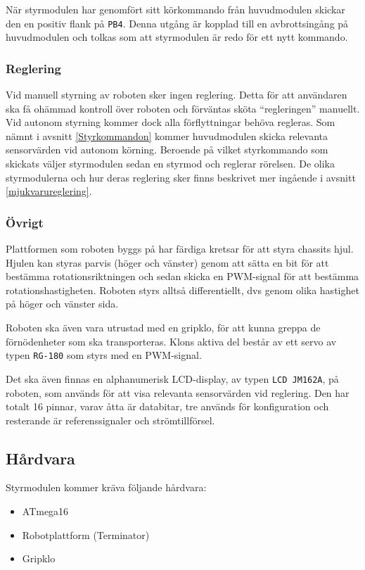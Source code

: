 \documentclass[11pt]{article}
\begin{document}
\begin{flushleft}
När styrmodulen har genomfört sitt körkommando från huvudmodulen skickar den en positiv flank på \verb+PB4+. Denna utgång är kopplad till en avbrottsingång på huvudmodulen och tolkas som att styrmodulen är redo för ett nytt kommando. 

\subsubsection{Reglering}
Vid manuell styrning av roboten sker ingen reglering. Detta för att användaren ska få ohämmad kontroll över roboten och förväntas sköta ``regleringen'' manuellt. Vid autonom styrning kommer dock alla förflyttningar behöva regleras. Som nämnt i avsnitt \ref{Styrkommandon} kommer huvudmodulen skicka relevanta sensorvärden vid autonom körning. Beroende på vilket styrkommando som skickats väljer styrmodulen sedan en styrmod och reglerar rörelsen. De olika styrmodulerna och hur deras reglering sker finns beskrivet mer ingående i avsnitt \ref{mjukvarureglering}.

\subsubsection{Övrigt}
Plattformen som roboten byggs på har färdiga kretsar för att styra chassits hjul. Hjulen kan styras parvis (höger och vänster) genom att sätta en bit för att bestämma rotationsriktningen och sedan skicka en PWM-signal för att bestämma rotationshastigheten. Roboten styrs alltså differentiellt, dvs genom olika hastighet på höger och vänster sida.

Roboten ska även vara utrustad med en gripklo, för att kunna greppa de förnödenheter som ska transporteras. Klons aktiva del består av ett servo av typen \verb+RG-180+ som styrs med en PWM-signal.

Det ska även finnas en alphanumerisk LCD-display, av typen \verb+LCD JM162A+, på roboten, som används för att visa relevanta sensorvärden vid reglering. Den har totalt 16 pinnar, varav åtta är databitar, tre används för konfiguration och resterande är referenssignaler och strömtillförsel.

\subsection{Hårdvara}
Styrmodulen kommer kräva följande hårdvara:
\begin{itemize}
	\item ATmega16
	\item Robotplattform (Terminator)
	\item Gripklo %
\end{itemize}


\end{flushleft}
\end{document}
